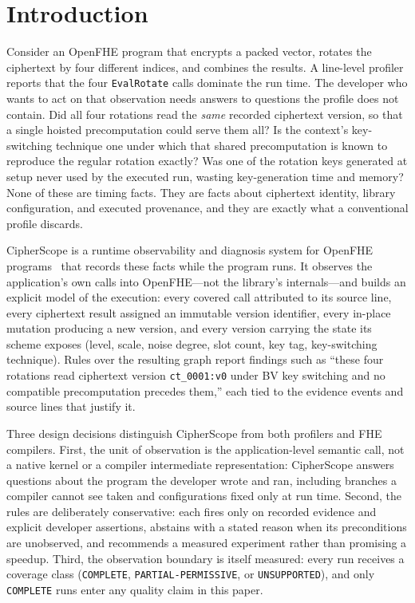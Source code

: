 \documentclass[sigconf,nonacm]{acmart}
\begin{document}
\section{Introduction}
\label{sec:intro}

Consider an OpenFHE program that encrypts a packed vector, rotates the
ciphertext by four different indices, and combines the results. A line-level
profiler reports that the four \texttt{EvalRotate} calls dominate the run
time. The developer who wants to act on that observation needs answers to
questions the profile does not contain. Did all four rotations read the
\emph{same} recorded ciphertext version, so that a single hoisted
precomputation could serve them all? Is the context's key-switching technique
one under which that shared precomputation is known to reproduce the regular
rotation exactly? Was one of the rotation keys generated at setup never used
by the executed run, wasting key-generation time and memory? None of these
are timing facts. They are facts about ciphertext identity, library
configuration, and executed provenance, and they are exactly what a
conventional profile discards.

CipherScope is a runtime observability and diagnosis system for OpenFHE
programs~\cite{openfhe2022} that records these facts while the program runs.
It observes the application's own calls into OpenFHE---not the library's
internals---and builds an explicit model of the execution: every covered call
attributed to its source line, every ciphertext result assigned an immutable
version identifier, every in-place mutation producing a new version, and
every version carrying the state its scheme exposes (level, scale, noise
degree, slot count, key tag, key-switching technique). Rules over the
resulting graph report findings such as ``these four rotations read
ciphertext version \texttt{ct\_0001:v0} under BV key switching and no
compatible precomputation precedes them,'' each tied to the evidence events
and source lines that justify it.

Three design decisions distinguish CipherScope from both profilers and FHE
compilers. First, the unit of observation is the application-level semantic
call, not a native kernel or a compiler intermediate representation:
CipherScope answers questions about the program the developer wrote and ran,
including branches a compiler cannot see taken and configurations fixed only
at run time. Second, the rules are deliberately conservative: each fires only
on recorded evidence and explicit developer assertions, abstains with a
stated reason when its preconditions are unobserved, and recommends a
measured experiment rather than promising a speedup. Third, the observation
boundary is itself measured: every run receives a coverage class
(\texttt{COMPLETE}, \texttt{PARTIAL-PERMISSIVE}, or \texttt{UNSUPPORTED}),
and only \texttt{COMPLETE} runs enter any quality claim in this paper.
\end{document}
